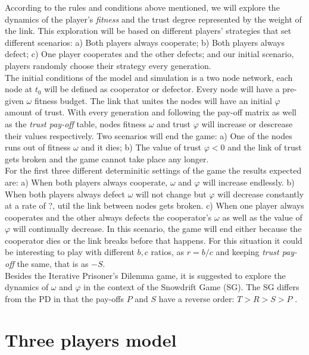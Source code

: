 \documentclass[11pt]{article}
\begin{document}
According to the rules and conditions above mentioned, we will explore the dynamics of the player's \emph{fitness} and the trust degree represented by the weight of the link. This exploration will be based on different players' strategies that set different scenarios: a) Both players always cooperate; b) Both players always defect; c) One player cooperates and the other defects; and our initial scenario, players randomly choose their strategy every generation.\\

The initial conditions of the model and simulation is a two node network, each node at $t_{0}$ will be defined as cooperator or defector. Every node will have a pre-given $\omega$ fitness budget. The link that unites the nodes will have an initial $\varphi$ amount of trust. With every generation and following the pay-off matrix as well as the \emph{trust pay-off} table, nodes fitness $\omega$ and trust $\varphi$ will increase or descrease their values respectively. Two scenarios will end the game: a) One of the nodes runs out of fitness $\omega$ and it dies; b) The value of trust $\varphi < 0$ and the link of trust gets broken and the game cannot take place any longer.\\

For the first three different determinitic settings of the game the results expected are: a) When both players always cooperate, $\omega$ and $\varphi$ will increase endlessly. b) When both players always defect $\omega$ will not change but $\varphi$ will decrease constantly at a rate of ?, util the link between nodes gets broken. c) When one player always cooperates and the other always defects the cooperator's $\omega$ as well as the value of $\varphi$ will continually decrease. In this scenario, the game will end either because the cooperator dies or the link breaks before that happens. For this situation it could be interesting to play with different $b,c$ ratios, as $r = b/c$ and keeping \emph{trust pay-off} the same, that is as $-S$.\\

Besides the Iterative Prisoner's Dilemma game, it is suggested to explore the dynamics of $\omega$ and $\varphi$ in the context of the Snowdrift Game (SG). The SG differs from the PD in that the pay-offs $P$ and $S$ have a reverse order: $T > R > S > P$ \cite{Hauert2004, Santos2005}.

\section{Three players model}
\end{document}
